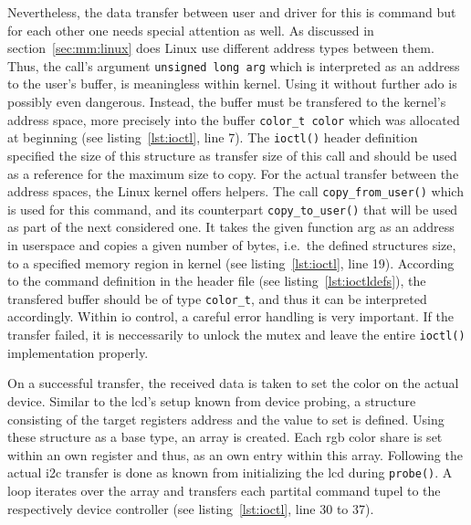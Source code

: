 Nevertheless, the data transfer between user and driver for this is command but for each other one needs special attention as well.
As discussed in section~\ref{sec:mm:linux} does Linux use different address types between them.
Thus, the call's argument \texttt{unsigned long arg} which is interpreted as an address to the user's buffer, is meaningless within kernel.
Using it without further ado is possibly even dangerous.
Instead, the buffer must be transfered to the kernel's address space, more precisely into the buffer \texttt{color_t color} which was allocated at beginning (see listing~\ref{lst:ioctl}, line 7).
The \texttt{ioctl()} header definition specified the size of this structure as transfer size of this call and should be used as a reference for the maximum size to copy.
For the actual transfer between the address spaces, the Linux kernel offers helpers.
The call \texttt{copy_from_user()} which is used for this command, and its counterpart \texttt{copy_to_user()} that will be used as part of the next considered one.
It takes the given function arg as an address in userspace and copies a given number of bytes, i.e.\ the defined structures size, to a specified memory region in kernel (see listing~\ref{lst:ioctl}, line 19).
According to the command definition in the header file (see listing~\ref{lst:ioctldefs}), the transfered buffer should be of type \texttt{color_t}, and thus it can be interpreted accordingly.
Within \ac{io} control, a careful error handling is very important.
If the transfer failed, it is neccessarily to unlock the mutex and leave the entire \texttt{ioctl()} implementation properly.

On a successful transfer, the received data is taken to set the color on the actual device.
Similar to the \ac{lcd}'s setup known from device probing, a structure consisting of the target registers address and the value to set is defined.
Using these structure as a base type, an array is created.
Each \ac{rgb} color share is set within an own register and thus, as an own entry within this array.
Following the actual \ac{i2c} transfer is done as known from initializing the \ac{lcd} during \texttt{probe()}.
A loop iterates over the array and transfers each partital command tupel to the respectively device controller (see listing~\ref{lst:ioctl}, line 30 to 37).


